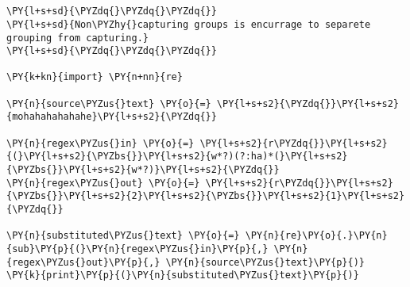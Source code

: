 

\section*{}

\begin{Verbatim}[commandchars=\\\{\}]
\PY{l+s+sd}{\PYZdq{}\PYZdq{}\PYZdq{}}
\PY{l+s+sd}{Non\PYZhy{}capturing groups is encurrage to separete grouping from capturing.}
\PY{l+s+sd}{\PYZdq{}\PYZdq{}\PYZdq{}}

\PY{k+kn}{import} \PY{n+nn}{re}

\PY{n}{source\PYZus{}text} \PY{o}{=} \PY{l+s+s2}{\PYZdq{}}\PY{l+s+s2}{mohahahahahahe}\PY{l+s+s2}{\PYZdq{}}

\PY{n}{regex\PYZus{}in} \PY{o}{=} \PY{l+s+s2}{r\PYZdq{}}\PY{l+s+s2}{(}\PY{l+s+s2}{\PYZbs{}}\PY{l+s+s2}{w*?)(?:ha)*(}\PY{l+s+s2}{\PYZbs{}}\PY{l+s+s2}{w*?)}\PY{l+s+s2}{\PYZdq{}}
\PY{n}{regex\PYZus{}out} \PY{o}{=} \PY{l+s+s2}{r\PYZdq{}}\PY{l+s+s2}{\PYZbs{}}\PY{l+s+s2}{2}\PY{l+s+s2}{\PYZbs{}}\PY{l+s+s2}{1}\PY{l+s+s2}{\PYZdq{}}

\PY{n}{substituted\PYZus{}text} \PY{o}{=} \PY{n}{re}\PY{o}{.}\PY{n}{sub}\PY{p}{(}\PY{n}{regex\PYZus{}in}\PY{p}{,} \PY{n}{regex\PYZus{}out}\PY{p}{,} \PY{n}{source\PYZus{}text}\PY{p}{)}
\PY{k}{print}\PY{p}{(}\PY{n}{substituted\PYZus{}text}\PY{p}{)}
\end{Verbatim}
